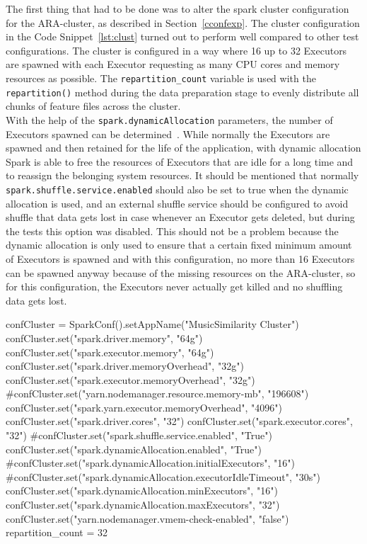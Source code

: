 \noindent The first thing that had to be done was to alter the spark cluster configuration for the ARA-cluster, as described in Section~\ref{cconfexp}.
\noindent The cluster configuration in the Code Snippet~\ref{lst:clust} turned out to perform well compared to other test configurations. The cluster is configured in a way where 16 up to 32 Executors are spawned with each Executor requesting as many CPU cores and memory resources as possible. The \lstinline{repartition_count} variable is used with the \lstinline{repartition()} method during the data preparation stage to evenly distribute all chunks of feature files across the cluster.\\
\noindent With the help of the \lstinline{spark.dynamicAllocation} parameters, the number of Executors spawned can be determined~\cite[p. 153]{sparkbook1}. While normally the Executors are spawned and then retained for the life of the application, with dynamic allocation Spark is able to free the resources of Executors that are idle for a long time and to reassign the belonging system resources. 
It should be mentioned that normally \lstinline{spark.shuffle.service.enabled} should also be set to true when the dynamic allocation is used, and an external shuffle service should be configured to avoid shuffle that data gets lost in case whenever an Executor gets deleted, but during the tests this option was disabled. This should not be a problem because the dynamic allocation is only used to ensure that a certain fixed minimum amount of Executors is spawned and with this configuration, no more than 16 Executors can be spawned anyway because of the missing resources on the ARA-cluster, so for this configuration, the Executors never actually get killed and no shuffling data gets lost.\\

\begin{pythonCode}[frame=single,label={lst:clust},caption={Cluster setup},captionpos=b]
confCluster = SparkConf().setAppName("MusicSimilarity Cluster")
confCluster.set("spark.driver.memory", "64g")
confCluster.set("spark.executor.memory", "64g")
confCluster.set("spark.driver.memoryOverhead", "32g")
confCluster.set("spark.executor.memoryOverhead", "32g")
#confCluster.set("yarn.nodemanager.resource.memory-mb", "196608")
confCluster.set("spark.yarn.executor.memoryOverhead", "4096")
confCluster.set("spark.driver.cores", "32")
confCluster.set("spark.executor.cores", "32")
#confCluster.set("spark.shuffle.service.enabled", "True")
confCluster.set("spark.dynamicAllocation.enabled", "True")
#confCluster.set("spark.dynamicAllocation.initialExecutors", "16")
#confCluster.set("spark.dynamicAllocation.executorIdleTimeout", "30s")	
confCluster.set("spark.dynamicAllocation.minExecutors", "16")
confCluster.set("spark.dynamicAllocation.maxExecutors", "32")
confCluster.set("yarn.nodemanager.vmem-check-enabled", "false")
repartition_count = 32
\end{pythonCode}

